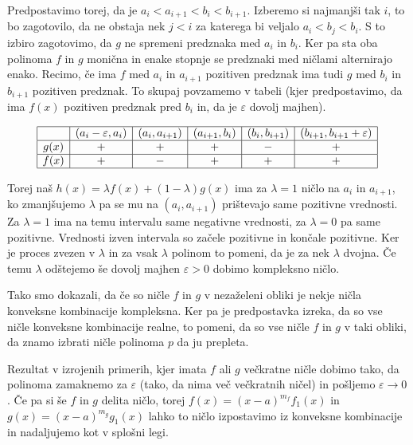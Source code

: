\begin{dokaz}
    Predpostavimo torej, da je \(a_i < a_{i+1} < b_i < b_{i+1}\). Izberemo si najmanjši tak \(i\), to bo zagotovilo, da ne obstaja nek \(j<i\) za katerega bi veljalo \(a_i < b_j < b_i\). S to izbiro zagotovimo, da \(g\) ne spremeni predznaka med \(a_i\) in \(b_i\). Ker pa sta oba polinoma \(f\) in \(g\) monična in enake stopnje se predznaki med ničlami alternirajo enako. Recimo, če ima \(f\) med \(a_i\) in \(a_{i+1}\) pozitiven predznak ima tudi \(g\) med \(b_i\) in \(b_{i+1}\) pozitiven predznak. To skupaj povzamemo v tabeli (kjer predpostavimo, da ima \(f(x)\) pozitiven predznak pred \(b_i\) in, da je \(\varepsilon\) dovolj majhen).
    \begin{center}
        \begin{align*}
            \begin{array}{|c|c|c|c|c|c|}
                \hline
                     & (a_i - \varepsilon, a_i) & (a_i, a_{i+1}) & (a_{i+1}, b_i) & (b_i, b_{i+1}) & (b_{i+1}, b_{i+1} + \varepsilon) \\ \hline
                g(x) & +                        & +          & +          & -          & +                        \\ \hline
                f(x) & +                        & -          & +          & +          & +                        \\ \hline
            \end{array}
        \end{align*}
    \end{center}
    Torej naš \(h(x)=\lambda f(x) + (1-\lambda) g(x)\) ima za \(\lambda = 1\) ničlo na \(a_i\) in \(a_{i+1}\), ko zmanjšujemo \(\lambda\) pa se mu na \((a_i, a_{i+1})\) prištevajo same pozitivne vrednosti. Za \(\lambda=1\) ima na temu intervalu same negativne vrednosti, za \(\lambda=0\) pa same pozitivne. Vrednosti izven intervala so začele pozitivne in končale pozitivne. Ker je proces zvezen v \(\lambda\) in za vsak \(\lambda\) polinom to pomeni, da je za nek \(\lambda\) dvojna. Če temu \(\lambda\) odštejemo še dovolj majhen \(\varepsilon>0\) dobimo kompleksno ničlo.

    Tako smo dokazali, da če so ničle \(f\) in \(g\) v nezaželeni obliki je nekje ničla konveksne kombinacije kompleksna. Ker pa je predpostavka izreka, da so vse ničle konveksne kombinacije realne, to pomeni, da so vse ničle \(f\) in \(g\) v taki obliki, da znamo izbrati ničle polinoma \(p\) da ju prepleta.

    Rezultat v izrojenih primerih, kjer imata \(f\) ali \(g\) večkratne ničle dobimo tako, da polinoma zamaknemo za \(\varepsilon\) (tako, da nima več večkratnih ničel) in pošljemo \(\varepsilon\to 0\). Če pa si še \(f\) in \(g\) delita ničlo, torej \(f(x) = (x-a)^{m_f} f_1(x)\) in \(g(x) = (x-a)^{m_g} g_1(x)\) lahko to ničlo izpostavimo iz konveksne kombinacije in nadaljujemo kot v splošni legi. 
\end{dokaz}

